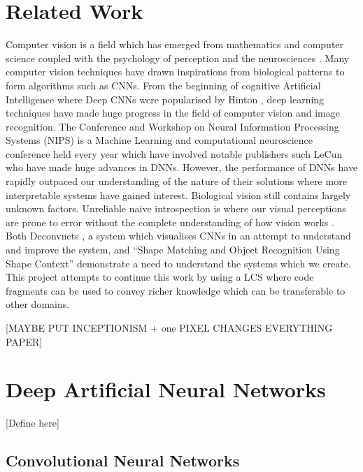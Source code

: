 \section{Related Work}
Computer vision is a field which has emerged from mathematics and computer science coupled with the psychology of perception and the neurosciences \cite{hartley2003multiple}. Many computer vision techniques have drawn inspirations from biological patterns to form algorithms such as CNNs.  From the beginning of cognitive Artificial Intelligence where Deep CNNs were popularised by Hinton  \cite{krizhevsky2012imagenet}, deep learning techniques have made huge progress in the field of computer vision and image recognition. The Conference and Workshop on Neural Information Processing Systems (NIPS) is a Machine Learning and computational neuroscience conference held every year which have involved notable publishers such LeCun \cite{lecun2015deep} who have made huge advances in DNNs. However, the performance of DNNs have rapidly outpaced our understanding of the nature of their solutions where more interpretable systems have gained interest. Biological vision still contains largely unknown factors. Unreliable naive introspection is where our visual perceptions are prone to error without the complete understanding of how vision works \cite{hartley2003multiple}. Both Deconvnets \cite{zeiler2014visualizing}, a system which visualises CNNs in an attempt to understand and improve the system, and ``Shape Matching and Object Recognition Using Shape Context'' \cite{belongie2002shape} demonstrate a need to understand the systems which we create. This project attempts to continue this work by using a LCS where code fragments can be used to convey richer knowledge which can be transferable to other domains.

[MAYBE PUT INCEPTIONISM + one PIXEL CHANGES EVERYTHING PAPER]

\section{Deep Artificial Neural Networks}
[Define here]
\subsection{Convolutional Neural Networks} \label{subsubsec:cnn}

